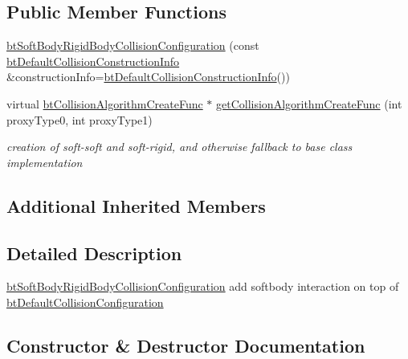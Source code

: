 \subsection*{Public Member Functions}
\begin{DoxyCompactItemize}
\item 
\hyperlink{classbtSoftBodyRigidBodyCollisionConfiguration_aed032b3ffc351d036e28b503d3cdc801}{bt\+Soft\+Body\+Rigid\+Body\+Collision\+Configuration} (const \hyperlink{structbtDefaultCollisionConstructionInfo}{bt\+Default\+Collision\+Construction\+Info} \&construction\+Info=\hyperlink{structbtDefaultCollisionConstructionInfo}{bt\+Default\+Collision\+Construction\+Info}())
\item 
virtual \hyperlink{structbtCollisionAlgorithmCreateFunc}{bt\+Collision\+Algorithm\+Create\+Func} $\ast$ \hyperlink{classbtSoftBodyRigidBodyCollisionConfiguration_a81be88bc433469b4703fc0fb9d504a50}{get\+Collision\+Algorithm\+Create\+Func} (int proxy\+Type0, int proxy\+Type1)
\begin{DoxyCompactList}\small\item\em creation of soft-\/soft and soft-\/rigid, and otherwise fallback to base class implementation \end{DoxyCompactList}\end{DoxyCompactItemize}
\subsection*{Additional Inherited Members}


\subsection{Detailed Description}
\hyperlink{classbtSoftBodyRigidBodyCollisionConfiguration}{bt\+Soft\+Body\+Rigid\+Body\+Collision\+Configuration} add softbody interaction on top of \hyperlink{classbtDefaultCollisionConfiguration}{bt\+Default\+Collision\+Configuration} 

\subsection{Constructor \& Destructor Documentation}
\mbox{\label{classbtSoftBodyRigidBodyCollisionConfiguration_aed032b3ffc351d036e28b503d3cdc801}} 
